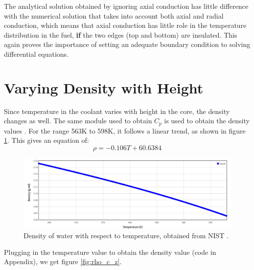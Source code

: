 \documentclass[12pt,letterpaper]{article}
\begin{document}
The analytical solution obtained by ignoring axial conduction has
little difference with the numerical solution that takes into account
both axial and radial conduction, which means that axial conduction
has little role in the temperature distribution in the fuel, \textbf{if}
the two edges (top and bottom) are insulated. This again proves the importance
of setting an adequate boundary condition to solving differential equations.

\section*{Varying Density with Height}
Since temperature in the coolant varies with height in the core,
the density changes as well. The same module used to obtain $C_p$
is used to obtain the density values \cite{romera_iapws:_2017}.
For the range 563K to 598K, it follows a linear trend, as shown
in figure \ref{fig:wat_den}.  This gives an equation of:
\[\rho = -0.106T + 60.6384\]


\begin{figure}[htbp!]
    \begin{center}
        \includegraphics[scale=0.4]{water_density.png}
    \end{center}
    \caption{Density of water with respect to temperature, obtained from NIST \cite{acree_phase_????}.}
    \label{fig:wat_den}
\end{figure}

Plugging in the temperature value to obtain the density value
(code in Appendix), we get figure \ref{fig:rho_c_z}.
\end{document}
